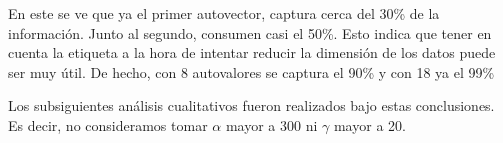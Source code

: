 En este se ve que ya el primer autovector, captura cerca del 30\% de la informaci\'on. Junto al segundo, consumen casi el 50\%. Esto indica que tener en cuenta la etiqueta a la hora de intentar reducir la dimensi\'on de los datos puede ser muy \'util. De hecho, con 8 autovalores se captura el 90\% y con 18 ya el 99\%

Los subsiguientes an\'alisis cualitativos fueron realizados bajo estas conclusiones. Es decir, no consideramos tomar $\alpha$ mayor a 300 ni $\gamma$ mayor a 20.

